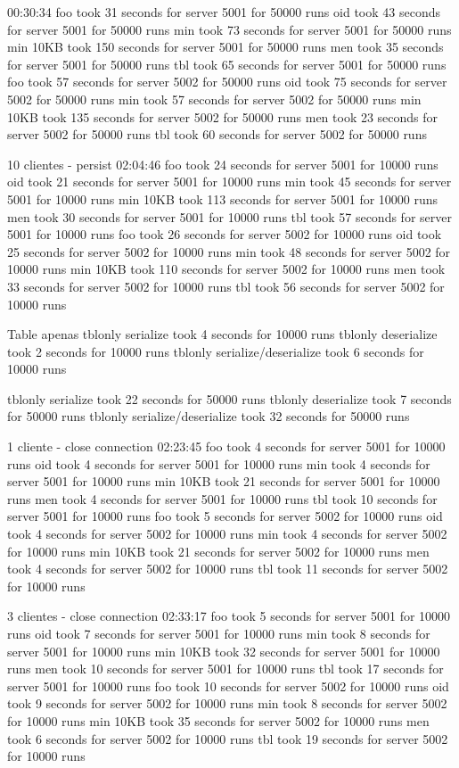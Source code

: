 \documentclass[11pt]{article}
\begin{document}
00:30:34
foo took 31 seconds for server 5001 for 50000 runs
oid took 43 seconds for server 5001 for 50000 runs
min took 73 seconds for server 5001 for 50000 runs
min 10KB took 150 seconds for server 5001 for 50000 runs
men took 35 seconds for server 5001 for 50000 runs
tbl took 65 seconds for server 5001 for 50000 runs
foo took 57 seconds for server 5002 for 50000 runs
oid took 75 seconds for server 5002 for 50000 runs
min took 57 seconds for server 5002 for 50000 runs
min 10KB took 135 seconds for server 5002 for 50000 runs
men took 23 seconds for server 5002 for 50000 runs
tbl took 60 seconds for server 5002 for 50000 runs


 10 clientes - persist
02:04:46
foo took 24 seconds for server 5001 for 10000 runs
oid took 21 seconds for server 5001 for 10000 runs
min took 45 seconds for server 5001 for 10000 runs
min 10KB took 113 seconds for server 5001 for 10000 runs
men took 30 seconds for server 5001 for 10000 runs
tbl took 57 seconds for server 5001 for 10000 runs
foo took 26 seconds for server 5002 for 10000 runs
oid took 25 seconds for server 5002 for 10000 runs
min took 48 seconds for server 5002 for 10000 runs
min 10KB took 110 seconds for server 5002 for 10000 runs
men took 33 seconds for server 5002 for 10000 runs
tbl took 56 seconds for server 5002 for 10000 runs


 Table apenas
tblonly serialize took 4 seconds for 10000 runs
tblonly deserialize took 2 seconds for 10000 runs
tblonly serialize/deserialize took 6 seconds for 10000 runs

tblonly serialize took 22 seconds for 50000 runs
tblonly deserialize took 7 seconds for 50000 runs
tblonly serialize/deserialize took 32 seconds for 50000 runs


 1 cliente - close connection
02:23:45
foo took 4 seconds for server 5001 for 10000 runs
oid took 4 seconds for server 5001 for 10000 runs
min took 4 seconds for server 5001 for 10000 runs
min 10KB took 21 seconds for server 5001 for 10000 runs
men took 4 seconds for server 5001 for 10000 runs
tbl took 10 seconds for server 5001 for 10000 runs
foo took 5 seconds for server 5002 for 10000 runs
oid took 4 seconds for server 5002 for 10000 runs
min took 4 seconds for server 5002 for 10000 runs
min 10KB took 21 seconds for server 5002 for 10000 runs
men took 4 seconds for server 5002 for 10000 runs
tbl took 11 seconds for server 5002 for 10000 runs


 3 clientes - close connection
02:33:17
foo took 5 seconds for server 5001 for 10000 runs
oid took 7 seconds for server 5001 for 10000 runs
min took 8 seconds for server 5001 for 10000 runs
min 10KB took 32 seconds for server 5001 for 10000 runs
men took 10 seconds for server 5001 for 10000 runs
tbl took 17 seconds for server 5001 for 10000 runs
foo took 10 seconds for server 5002 for 10000 runs
oid took 9 seconds for server 5002 for 10000 runs
min took 8 seconds for server 5002 for 10000 runs
min 10KB took 35 seconds for server 5002 for 10000 runs
men took 6 seconds for server 5002 for 10000 runs
tbl took 19 seconds for server 5002 for 10000 runs



\end{document}
